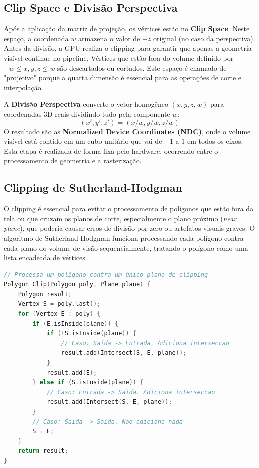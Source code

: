 \subsection{Clip Space e Divisão Perspectiva}

Após a aplicação da matriz de projeção, os vértices estão no \textbf{Clip Space}. Neste espaço, a coordenada $w$ armazena o valor de $-z$ original (no caso da perspectiva). Antes da divisão, a GPU realiza o clipping para garantir que apenas a geometria visível continue no pipeline. Vértices que estão fora do volume definido por $-w \le x,y,z \le w$ são descartados ou cortados. Este espaço é chamado de "projetivo" porque a quarta dimensão é essencial para as operações de corte e interpolação.

A \textbf{Divisão Perspectiva} converte o vetor homogêneo $(x, y, z, w)$ para coordenadas 3D reais dividindo tudo pela componente $w$:
\[ (x', y', z') = (x/w, y/w, z/w) \]
O resultado são as \textbf{Normalized Device Coordinates (NDC)}, onde o volume visível está contido em um cubo unitário que vai de $-1$ a $1$ em todos os eixos. Esta etapa é realizada de forma fixa pelo hardware, ocorrendo entre o processamento de geometria e a rasterização.

\subsection{Clipping de Sutherland-Hodgman}

O clipping é essencial para evitar o processamento de polígonos que estão fora da tela ou que cruzam os planos de corte, especialmente o plano próximo (\textit{near plane}), que poderia causar erros de divisão por zero ou artefatos visuais graves. O algoritmo de Sutherland-Hodgman funciona processando cada polígono contra cada plano do volume de visão sequencialmente, tratando o polígono como uma lista encadeada de vértices.

\begin{lstlisting}[language=C, caption=Pseudocódigo simplificado do Clipping de Sutherland-Hodgman]
// Processa um polígono contra um único plano de clipping
Polygon Clip(Polygon poly, Plane plane) {
    Polygon result;
    Vertex S = poly.last();
    for (Vertex E : poly) {
        if (E.isInside(plane)) {
            if (!S.isInside(plane)) {
                // Caso: Saida -> Entrada. Adiciona interseccao
                result.add(Intersect(S, E, plane));
            }
            result.add(E);
        } else if (S.isInside(plane)) {
            // Caso: Entrada -> Saida. Adiciona interseccao
            result.add(Intersect(S, E, plane));
        }
        // Caso: Saida -> Saida. Nao adiciona nada
        S = E;
    }
    return result;
}
\end{lstlisting}

